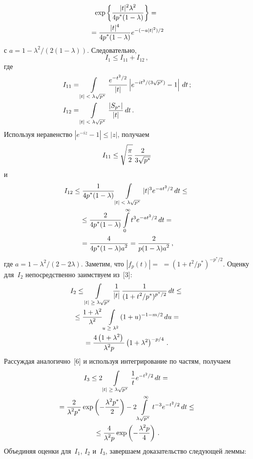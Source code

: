\begin{multicols}{2}
\begin{multline*}
             \exp \left\{\fr{|t|^2 \lambda^2}{4p^*(1 -\lambda)} \right\}={}\\
{}             =  \fr{|t|^4}{4p^* (1-\lambda)} e^{-(-a|t|^2)/2}
\end{multline*}
с $a = 1 - \lambda^2 /(2(1-\lambda))$.
Следовательно,
\begin{equation*}
I_1 \le I_{11} +I_{12}\,,
\end{equation*}
где
\begin{align*}
I_{11} &= \int\limits_{|t| \;<\; \lambda \sqrt{p^*}} \fr{e^{-t^2/2}}{|t|}
\left| e^{-it^3/(3\sqrt{p^*})} - 1\right|\,dt\,;\\
I_{12} &= \int\limits_{|t|\; <\; \lambda \sqrt{p^*}} \fr{|S_{p^*}|}{|t|}\,dt\,.
\end{align*}
Используя неравенство $|e^{-iz} -1| \le |z|$, получаем
$$
I_{11}\leq \sqrt{\fr{\pi}{2}}\,\fr{2}{3\sqrt{p^*}}
$$
и
\begin{multline*}
I_{12} \le \fr{1}{4p^*(1-\lambda)}\int\limits_{|t|\; <\; \lambda \sqrt{p^*}} |t|^3 e^{-at^2/2} \,dt
 \leq{}\\
 {}\leq \fr{2}{4p^*(1-\lambda)} \int\limits^{\infty}_{0} t^3 e^{-at^2/2}\,dt ={}\\
{}=\fr{4}{4p^*(1-\lambda)a^2} =\fr{2}{p(1-\lambda)a^2}\,,
\end{multline*}
где $a = 1 - \lambda^2/(2-2\lambda)$.
Заметим, что $|f_p (t)| =$\linebreak
$= (1 + t^2/p^*)^{-p^*/2}$. Оценку для~$I_2$ непосредственно заимствуем из~[3]:
\begin{multline*}
I_2 \leq \int\limits_{|t|\; \ge\; \lambda \sqrt{p^*}} \fr{1}{|t|}\, \fr{1}{(1 +t^2/p^*)^{p^*/2}}\,dt \leq{}\\
{} \leq \fr{1+ \lambda^2}{\lambda^2} \int\limits_{u \;\ge\; \lambda^2} (1+u)^{-1-m/2}\,du ={} \\
                   =\fr{4\left(1+ \lambda^2\right)}{\lambda^2 p} \left(1+\lambda^2\right)^{-p/4}\,.
\end{multline*}
Рассуждая аналогично~[6] и используя интегрирование по частям, получаем
\begin{multline*}
I_3 \leq 2 \int\limits_{|t|\; \ge\; \lambda \sqrt{p^*}} \fr{1}{t} e^{-t^2/2}\,dt ={}\\
{}= \fr{2}{\lambda^2 p^*} \exp \left(-\fr{\lambda^2 p^*}{2}\right)
                    -2 \int\limits^{\infty}_{\lambda \sqrt{p^*}} t^{-3} e^{-t^2/2}\,dt \leq{}\\
                    {}\leq \fr{4}{\lambda^2 p} \exp \left(-\fr{\lambda^2 p}{4}\right)\,.
\end{multline*}
Объединяя оценки для~$I_1$, $I_2$ и~$I_3$, завершаем доказательство следующей леммы:


\end{multicols}

